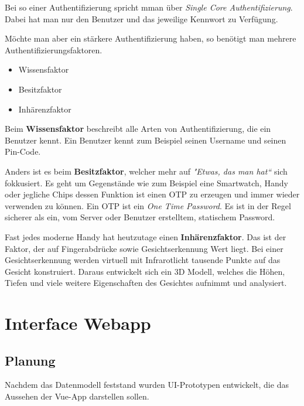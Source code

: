 Bei so einer Authentifizierung spricht mman über \textit{Single Core Authentifizierung}. Dabei hat man nur den Benutzer und das 
jeweilige Kennwort zu Verfügung.

\cite{Authorization-Faktoren}
Möchte man aber ein stärkere Authentifizierung haben, so benötigt man mehrere Authentifizierungsfaktoren.
\begin{itemize}
    \item Wissensfaktor
    \item Besitzfaktor
    \item Inhärenzfaktor
\end{itemize}

Beim \textbf{Wissensfaktor} beschreibt alle Arten von Authentifizierung, die ein Benutzer kennt. Ein Benutzer
kennt zum Beispiel seinen Username und seinen Pin-Code.


Anders ist es beim \textbf{Besitzfaktor}, welcher mehr auf \textit{"Etwas, das man hat“} sich fokkusiert. Es geht um 
Gegenstände wie zum Beispiel eine Smartwatch, Handy oder jegliche Chips dessen Funktion ist einen OTP zu erzeugen und 
immer wieder verwenden zu können.
Ein OTP ist ein \textit{One Time Password}. Es ist in der Regel sicherer als ein, vom Server oder Benutzer erstelltem, statischem Password.

Fast jedes moderne Handy hat heutzutage einen \textbf{Inhärenzfaktor}. Das ist der Faktor, der auf Fingerabdrücke sowie Gesichtserkennung
Wert liegt. Bei einer Gesichtserkennung werden virtuell mit Infrarotlicht tausende Punkte auf das Gesicht konstruiert. Daraus
entwickelt sich ein 3D Modell, welches die Höhen, Tiefen und viele weitere Eigenschaften des Gesichtes aufnimmt und analysiert.


\section {Interface Webapp}
\author{Benjamin Besic}
\subsection{Planung}

Nachdem das Datenmodell feststand wurden UI-Prototypen entwickelt, die das Aussehen der Vue-App darstellen sollen.


